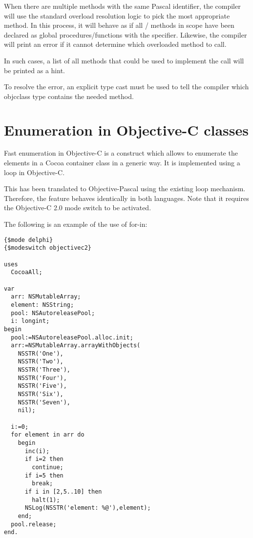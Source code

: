 When there are multiple methods with the same Pascal identifier, the
compiler will use the standard overload resolution logic to pick the most
appropriate method. In this process, it will behave as if all
/ methods in scope have been declared as global
procedures/functions with the  specifier. Likewise, the compiler
will print an error if it cannot determine which overloaded method to call.

In such cases, a list of all methods that could be used to implement the call
will be printed as a hint.

To resolve the error, an explicit type cast must be used to tell the compiler
which objcclass type contains the needed method.

\section{Enumeration in Objective-C classes}
Fast enumeration in Objective-C is a construct which allows to enumerate
the elements in a Cocoa container class in a generic way. It is implemented
using a  loop in Objective-C.

This has been translated to Objective-Pascal using the existing 
loop mechanism. Therefore, the feature behaves identically in both languages.
Note that it requires the Objective-C 2.0 mode switch to be activated.

The following is an example of the use of for-in:
\begin{verbatim}
{$mode delphi}
{$modeswitch objectivec2}

uses
  CocoaAll;

var
  arr: NSMutableArray;
  element: NSString;
  pool: NSAutoreleasePool;
  i: longint;
begin
  pool:=NSAutoreleasePool.alloc.init;
  arr:=NSMutableArray.arrayWithObjects(
    NSSTR('One'),
    NSSTR('Two'),
    NSSTR('Three'),
    NSSTR('Four'),
    NSSTR('Five'),
    NSSTR('Six'),
    NSSTR('Seven'),
    nil);

  i:=0;
  for element in arr do
    begin
      inc(i);
      if i=2 then
        continue;
      if i=5 then
        break;
      if i in [2,5..10] then
        halt(1);
      NSLog(NSSTR('element: %@'),element);
    end;
  pool.release;
end.
\end{verbatim}

